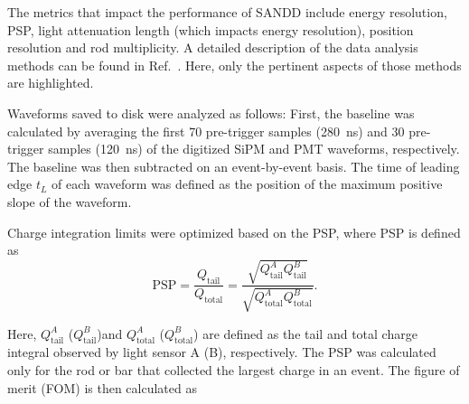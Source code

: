 \documentclass[final,5p,times,twocolumn]{elsarticle}
\begin{document}
The metrics that impact the performance of SANDD include energy resolution, %
PSP, light attenuation length (which impacts energy resolution), position resolution and rod multiplicity. A detailed description of the data analysis methods can be found in Ref.~\cite{SANDD1}. Here, only the pertinent aspects of those methods are highlighted. 

Waveforms saved to disk were analyzed as follows:
First, the baseline was calculated by averaging the first 70 pre-trigger samples (280~ns) and 30 pre-trigger samples (120~ns) of the digitized SiPM and PMT waveforms, respectively. 
The baseline was then subtracted on an event-by-event basis. 
The time of leading edge $t_{L}$ of each waveform was defined %
as the position of the maximum positive slope of the waveform.

Charge integration limits were optimized based on the PSP, where PSP is defined as
%
\begin{equation} \label{eq_psp}
    \mathrm{PSP} = \frac{Q_{\mathrm{tail}} }{ Q_{\mathrm{total}} } =
    \frac{\sqrt{ Q_{\mathrm{tail}}^{A\; }  Q_{\mathrm{tail}}^{B\; } } }
    {     \sqrt{ Q_{\mathrm{total}}^{A\;} Q_{\mathrm{total}}^{B\; }} }.
\end{equation}

Here, $Q_{\mathrm{tail}}^{A}$ ($Q_{\mathrm{tail}}^{B}$)and $Q_{\mathrm{total}}^{A}$ ($Q_{\mathrm{total}}^{B}$) are defined as the tail and total charge integral observed by light sensor A (B), respectively. The PSP was calculated only for the rod or bar that collected the largest charge in an event. The figure of merit (FOM) is then calculated as
%
\end{document}
